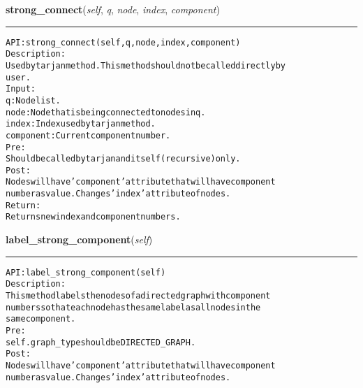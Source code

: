     \label{coinor:gimpy:graph:Graph:strong_connect}

    \vspace{0.5ex}

\hspace{.8\funcindent}\begin{boxedminipage}{\funcwidth}

    \raggedright \textbf{strong\_connect}(\textit{self}, \textit{q}, \textit{node}, \textit{index}, \textit{component})

    \vspace{-1.5ex}

    \rule{\textwidth}{0.5\fboxrule}
\setlength{\parskip}{2ex}
\begin{alltt}

API: strong\_connect (self, q, node, index, component)
Description:
Used by tarjan method. This method should not be called directly by
user.
Input:
    q: Node list.
    node: Node that is being connected to nodes in q.
    index: Index used by tarjan method.
    component: Current component number.
Pre:
    Should be called by tarjan and itself (recursive) only.
Post:
    Nodes will have 'component' attribute that will have component
    number as value. Changes 'index' attribute of nodes.
Return:
    Returns new index and component numbers.
\end{alltt}

\setlength{\parskip}{1ex}
    \end{boxedminipage}

    \label{coinor:gimpy:graph:Graph:label_strong_component}

    \vspace{0.5ex}

\hspace{.8\funcindent}\begin{boxedminipage}{\funcwidth}

    \raggedright \textbf{label\_strong\_component}(\textit{self})

    \vspace{-1.5ex}

    \rule{\textwidth}{0.5\fboxrule}
\setlength{\parskip}{2ex}
\begin{alltt}

API: label\_strong\_component(self)
Description:
This method labels the nodes of a directed graph with component
numbers so that each node has the same label as all nodes in the
same component.
Pre:
    self.graph\_type should be DIRECTED\_GRAPH.
Post:
    Nodes will have 'component' attribute that will have component
    number as value. Changes 'index' attribute of nodes.
\end{alltt}

\setlength{\parskip}{1ex}
    \end{boxedminipage}

